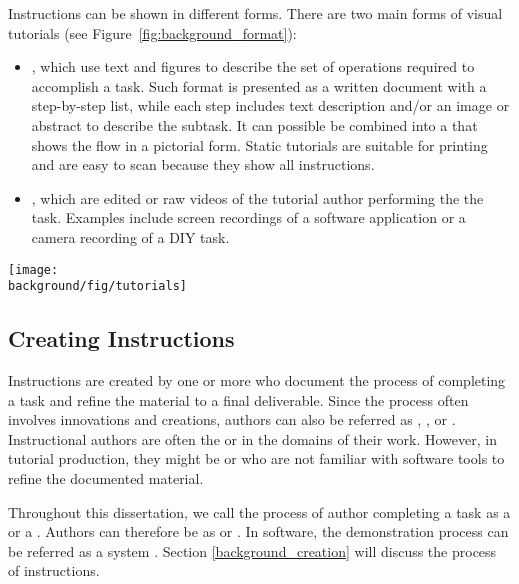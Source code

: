 Instructions can be shown in different forms. There are two main forms of visual tutorials (see Figure~\ref{fig:background_format}):
\begin{itemize}
  \itemsep -2pt
  \item {}, which use text and figures to describe the set of operations required to accomplish a task. Such format is presented as a written document with a step-by-step list, while each step includes text description and/or an image or abstract  to describe the subtask. It can possible be combined into a  that shows the flow in a pictorial form. Static tutorials are suitable for printing and are easy to scan because they show all instructions.
  \item {}, which are edited or raw videos of the tutorial author performing the the task. Examples include screen recordings of a software application or a camera recording of a DIY task.
\end{itemize}

\begin{figure*}[t]
  \centering
  \texttt{[image: \\background/fig/tutorials]}
  \caption{Tutorial formats. }
  \label{fig:background_format}
\end{figure*}


\subsection{Creating Instructions}
Instructions are created by one or more  who document the process of completing a task and refine the material to a final deliverable.
%
Since the process often involves innovations and creations, authors can also be referred as , , or .
%
Instructional authors are often the  or  in the domains of their work. However, in tutorial production, they might be  or  who are not familiar with software tools to refine the documented material.

Throughout this dissertation, we call the process of author completing a task as a  or a . Authors can therefore be as  or .
%
In software, the demonstration process can be referred as a system . Section \ref{background_creation} will discuss the  process of instructions.

